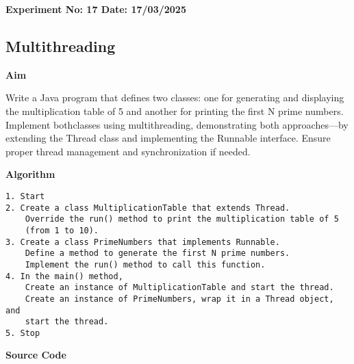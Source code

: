 \textbf{Experiment No: 17 \hfill Date: 17/03/2025}

\begin{center}
    \Large \subsection*{Multithreading}
\end{center}

\textbf{Aim}
\vspace{0.5cm}

Write a Java program that defines two classes: one for generating and displaying the multiplication table of 5 and another for printing the first N prime numbers. Implement bothclasses using multithreading, demonstrating both approaches—by extending the Thread class and implementing the Runnable interface. Ensure proper thread management and synchronization if needed.

\vspace{0.5cm}
\textbf{Algorithm}
\vspace{0.5cm}
\begin{verbatim}
1. Start
2. Create a class MultiplicationTable that extends Thread.
    Override the run() method to print the multiplication table of 5 
    (from 1 to 10).
3. Create a class PrimeNumbers that implements Runnable.
    Define a method to generate the first N prime numbers.
    Implement the run() method to call this function.
4. In the main() method,
    Create an instance of MultiplicationTable and start the thread.
    Create an instance of PrimeNumbers, wrap it in a Thread object, and 
    start the thread.
5. Stop
\end{verbatim}

\vspace{0.5cm}
\textbf{Source Code}

